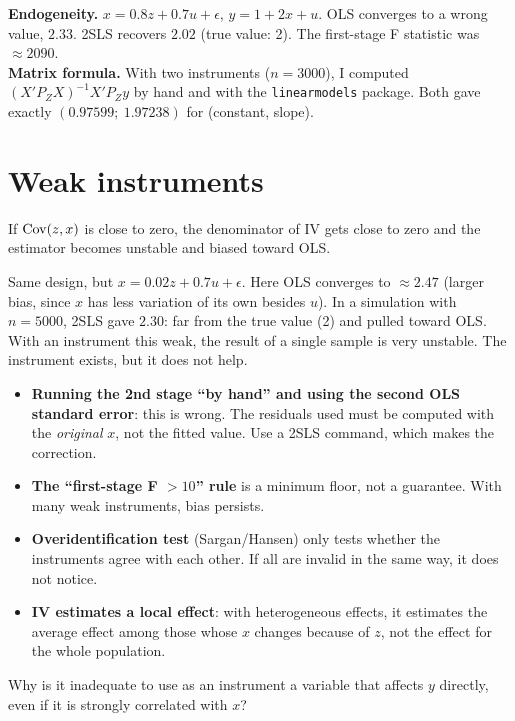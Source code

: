 \begin{simulacao}
\textbf{Endogeneity.} $x=0.8z+0.7u+\epsilon$, $y=1+2x+u$. OLS converges to a wrong value, $2.33$. 2SLS recovers $2.02$ (true value: 2). The first-stage F statistic was $\approx2090$.\\
\textbf{Matrix formula.} With two instruments ($n=3000$), I computed $(X'P_ZX)^{-1}X'P_Zy$ by hand and with the \texttt{linearmodels} package. Both gave exactly $(0.97599;\ 1.97238)$ for (constant, slope).
\end{simulacao}

\section{Weak instruments}
If $\operatorname{Cov}(z,x)$ is close to zero, the denominator of IV gets close to zero and the estimator becomes unstable and biased toward OLS.

\begin{simulacao}
Same design, but $x=0.02z+0.7u+\epsilon$. Here OLS converges to $\approx2.47$ (larger bias, since $x$ has less variation of its own besides $u$). In a simulation with $n=5000$, 2SLS gave $2.30$: far from the true value (2) and pulled toward OLS. With an instrument this weak, the result of a single sample is very unstable. The instrument exists, but it does not help.
\end{simulacao}

\begin{atencao}
\begin{itemize}[leftmargin=1.2em]
\item \textbf{Running the 2nd stage ``by hand'' and using the second OLS standard error}: this is wrong. The residuals used must be computed with the \emph{original} $x$, not the fitted value. Use a 2SLS command, which makes the correction.
\item \textbf{The ``first-stage F $>10$'' rule} is a minimum floor, not a guarantee. With many weak instruments, bias persists.
\item \textbf{Overidentification test} (Sargan/Hansen) only tests whether the instruments agree with each other. If all are invalid in the same way, it does not notice.
\item \textbf{IV estimates a local effect}: with heterogeneous effects, it estimates the average effect among those whose $x$ changes because of $z$, not the effect for the whole population.
\end{itemize}
\end{atencao}

\begin{exercicio}
Why is it inadequate to use as an instrument a variable that affects $y$ directly, even if it is strongly correlated with $x$?
\end{exercicio}
